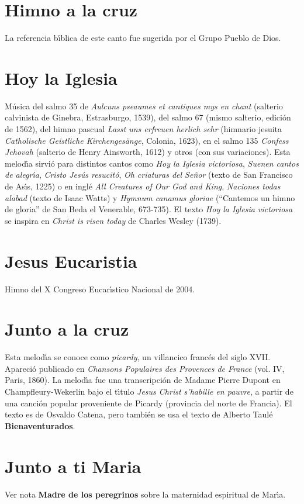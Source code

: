 \documentclass[landscape,12pt]{report}
\begin{document}
\section*{\small Himno a la cruz} \noindent\footnotesize La referencia b\'\i blica de este canto fue sugerida por el Grupo Pueblo de Dios.
\section*{\small Hoy la Iglesia} \noindent\footnotesize M\'usica del salmo 35 de \textit{Aulcuns pseaumes et cantiques mys en chant} (salterio calvinista de Ginebra, Estrasburgo, 1539), del salmo 67 (mismo salterio, edici\'on de 1562), del himno pascual \textit{Lasst uns erfreuen herlich sehr} (himnario jesuita \textit{Catholische Geistliche Kirchenges\"ange}, Colonia, 1623), en el salmo 135 \textit{Confess Jehovah} (salterio de Henry Ainsworth, 1612) y otros (con sus variaciones). Esta melod\'\i a sirvi\'o para distintos cantos como \textit{Hoy la Iglesia victoriosa}, \textit{Suenen cantos de alegr\'\i a}, \textit{Cristo Jes\'us resucit\'o}, \textit{Oh criaturas del Se\~nor} (texto de San Francisco de As\'\i s, 1225) o en ingl\'e \textit{All Creatures of Our God and King}, \textit{Naciones todas alabad} (texto de Isaac Watts) y \textit{Hymnum canamus gloriae} (``Cantemos un himno de gloria'' de San Beda el Venerable, 673-735). El texto \textit{Hoy la Iglesia victoriosa} se inspira en \textit{Christ is risen 
today} de Charles Wesley (1739).
\section*{\small Jesus Eucaristia} \noindent\footnotesize Himno del X Congreso Eucar\'\i stico Nacional de 2004. 
\section*{\small Junto a la cruz}  Esta melod\'\i a se conoce como \textit{picardy}, un villancico franc\'es del siglo XVII. Apareci\'o publicado en \textit{Chansons Populaires des Provences de France} (vol. IV, Paris, 1860). La melod\'\i a fue una transcripci\'on de Madame Pierre Dupont en Champfleury-Wekerlin bajo el t\'\i tulo \textit{Jesus Christ s'habille en pauvre}, a partir de una canci\'on popular proveniente de Picardy (provincia del norte de Francia). El texto es de Osvaldo Catena, pero tambi\'en se usa el texto de Alberto Taul\'e \textbf{Bienaventurados}. 
\section*{\small Junto a ti Maria} \noindent\footnotesize Ver nota \textbf{Madre de los peregrinos} sobre la maternidad espiritual de Mar\'\i a.
\end{document}
